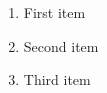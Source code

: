 \documentclass{article}
\begin{document}
\begin{enumerate}
  \item First item
  \item Second item
  \item Third item
\end{enumerate}
\end{document}
